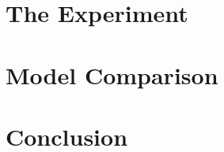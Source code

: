 \documentclass{llncs}
\begin{document}
\section{The Experiment}




\section{Model Comparison}




\section{Conclusion}






\end{document}
